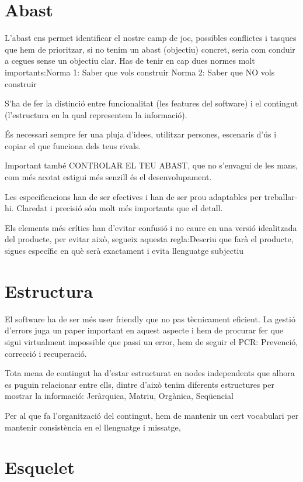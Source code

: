 \documentclass{article}
\begin{document}
\section{Abast}
\hfill

L’abast ens permet identificar el nostre camp de joc, possibles conflictes i tasques que hem de prioritzar, si no tenim un abast (objectiu) concret, seria com conduir a cegues sense un objectiu clar. Has de tenir en cap dues normes molt importants:Norma 1: Saber que vols construir
Norma 2: Saber que NO vols construir

S’ha de fer la distinció entre funcionalitat (les features del software) i el contingut (l’estructura en la qual representem la informació).

És necessari sempre fer una pluja d’idees, utilitzar persones, escenaris d’ús i copiar el que funciona dels teus rivals.

Important també CONTROLAR EL TEU ABAST, que no s’envagui de les mans, com més acotat estigui més senzill és el desenvolupament.

Les especificacions han de ser efectives i han de ser prou adaptables per treballar-hi. Claredat i precisió són molt més importants que el detall.  

Els elements més crítics han d'evitar confusió i no caure en una versió idealitzada del producte, per evitar això, segueix aquesta regla:Descriu que farà el producte, sigues específic en què serà exactament i evita llenguatge subjectiu


\section{Estructura}
\hfill

El software ha de ser més user friendly que no pas tècnicament eficient. La gestió d’errors juga un paper important en aquest aspecte i hem de procurar fer que sigui virtualment impossible que passi un error, hem de seguir el PCR: Prevenció, correcció i recuperació.

Tota mena de contingut ha d'estar estructurat en nodes independents que alhora es puguin relacionar entre ells, dintre d’això tenim diferents estructures per mostrar la informació: Jeràrquica, Matriu, Orgànica, Seqüencial

Per al que fa l’organització del contingut, hem de mantenir un cert vocabulari per mantenir consistència en el llenguatge i missatge, 


\section{Esquelet}
\hfill
\end{document}

